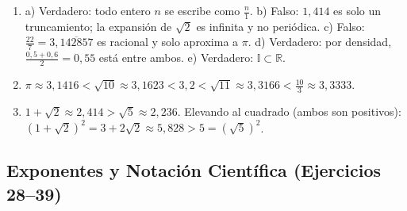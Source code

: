 \documentclass[12pt, letterpaper]{article}
\begin{document}
\begin{enumerate}[leftmargin=*, label=\textbf{\arabic*.}]
    \item a) Verdadero: todo entero $n$ se escribe como $\frac{n}{1}$. \quad b) Falso: $1{,}414$ es solo un truncamiento; la expansión de $\sqrt{2}$ es infinita y no periódica. \quad c) Falso: $\frac{22}{7} = 3{,}\overline{142857}$ es racional y solo aproxima a $\pi$. \quad d) Verdadero: por densidad, $\frac{0{,}5 + 0{,}6}{2} = 0{,}55$ está entre ambos. \quad e) Verdadero: $\mathbb{I} \subset \mathbb{R}$.

    \item $\pi \approx 3{,}1416 < \sqrt{10} \approx 3{,}1623 < 3{,}2 < \sqrt{11} \approx 3{,}3166 < \frac{10}{3} \approx 3{,}3333$.

    \item $1 + \sqrt{2} \approx 2{,}414 > \sqrt{5} \approx 2{,}236$. Elevando al cuadrado (ambos son positivos): $(1+\sqrt{2})^2 = 3 + 2\sqrt{2} \approx 5{,}828 > 5 = (\sqrt{5})^2$.
  \end{enumerate}

  \subsection*{Exponentes y Notación Científica (Ejercicios 28--39)}
\end{document}

